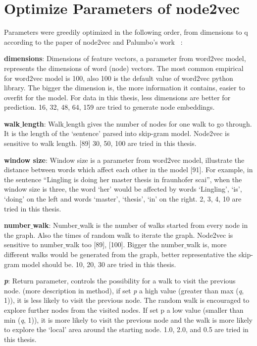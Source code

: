 \section{Optimize Parameters of node2vec} \label{op_node2vec}

Parameters were greedily optimized in the following order, from dimensions to q according to the paper of node2vec and Palumbo’s work ~\cite{gangemi_knowledge_2018}:

\textbf{dimensions}: Dimensions of feature vectors, a parameter from word2vec model, represents the dimensions of word (node) vectors. The most common empirical for word2vec model is 100, also 100 is the default value of word2vec python library. The bigger the dimension is, the more information it contains, easier to overfit for the model. For data in this thesis, less dimensions are better for prediction. 16, 32, 48, 64, 159 are tried to generate node embeddings.

\textbf{walk$\_$length}: Walk$\_$length gives the number of nodes for one walk to go through. It is the length of the ‘sentence’ parsed into skip-gram model. Node2vec is sensitive to walk length. [89] 30, 50, 100 are tried in this thesis.

\textbf{window size}: Window size is a parameter from word2vec model, illustrate the distance between words which affect each other in the model [91]. For example, in the sentence “Lingling is doing her master thesis in fraunhofer scai”, when the window size is three, the word ‘her’ would be affected by words ‘Lingling’, ‘is’, ‘doing’ on the left and words ‘master’, ‘thesis’, ‘in’ on the right. 2, 3, 4, 10 are tried in this thesis.

\textbf{number$\_$walk}: Number$\_$walk is the number of walks started from every node in the graph. Also the times of random walk to iterate the graph. Node2vec is sensitive to number$\_$walk too [89], [100]. Bigger the number$\_$walk is, more different walks would be generated from the graph, better representative the skip-gram model should be. 10, 20, 30 are tried in this thesis.

\textbf{\emph{p}}: Return parameter, controls the possibility for a walk to visit the previous node. (more description in method), if set \textit{p} a high value (greater than max (\textit{q}, 1)), it is less likely to visit the previous node. The random walk is encouraged to explore further nodes from the visited nodes. If set p a low value (smaller than min (\textit{q}, 1)), it is more likely to visit the previous node and the walk is more likely to explore the ‘local’ area around the starting node. 1.0, 2.0, and 0.5 are tried in this thesis.

